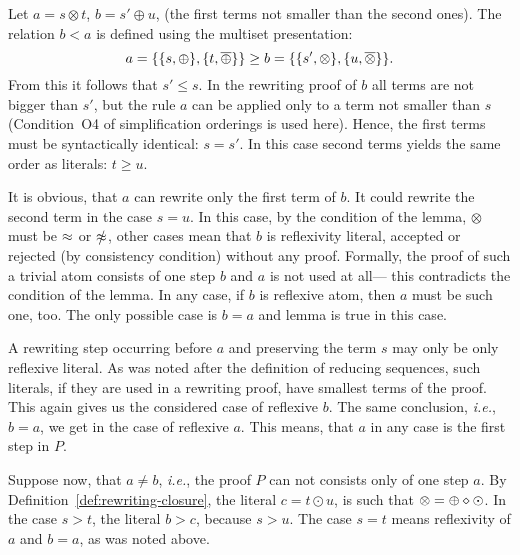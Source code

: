 \begin{PROOF}
Let \(a=s\otimes t\), \(b=s'\oplus u\), (the first terms not smaller than the
second ones). The relation \(b<a\) is defined using the multiset
presentation:
\[a=\{\{s,\oplus\},\{t,\overline{\oplus}\}\} \geq
    b=\{\{s',\otimes\},\{u,\overline{\otimes}\}\}.\] 
From this it follows that $s'\leq s$.  In the rewriting proof of $b$ all
terms are not bigger than $s'$, but the rule $a$ can be applied only to a
term not smaller than $s$ (Condition~O4 of simplification orderings is used
here). Hence, the first terms must be syntactically identical: $s=s'$. In
this case second terms yields the same order as literals: \(t\geq u\).

It is obvious, that $a$ can rewrite only the first term of $b$. It could
rewrite the second term in the case \(s=u\). In this case, by the condition
of the lemma, \(\otimes\) must be \(\mathbin{\approx}\) or \(\notEq\), other cases mean
that $b$ is reflexivity literal, accepted or rejected (by consistency
condition) without any proof.  Formally, the proof of such a trivial atom
consists of one step $b$ and $a$ is not used at all--- this contradicts the
condition of the lemma.  In any case, if $b$ is reflexive atom, then $a$ must
be such one, too. The only possible case is \(b=a\) and lemma is true in this
case.

A rewriting step occurring before $a$ and preserving the term $s$ may only be
only reflexive literal. As was noted after the definition of reducing
sequences, such literals, if they are used in a rewriting proof, have
smallest terms of the proof. This again gives us the considered case of
reflexive $b$. The same conclusion, {\em i.e.}, \(b=a\), we get in the case
of reflexive $a$.  This means, that $a$ in any case is the first step in $P$.

Suppose now, that \(a\ne b\), {\em i.e.}, the proof \(P\) can not consists
only of one step \(a\). By Definition~\ref {def:rewriting-closure}, the
literal \(c=t\odot u\), is such that 
\(\otimes =\oplus\diamond\odot\).
In the case \(s>t\), the literal \(b>c\), because \(s>u\). The case \(s=t\)
means reflexivity of $a$ and \(b=a\), as was noted above.
\end{PROOF}

